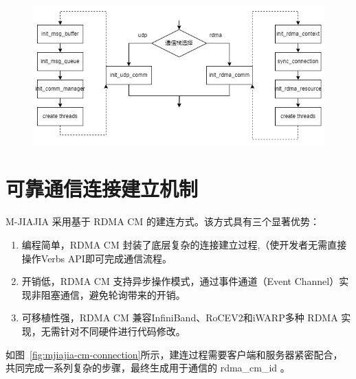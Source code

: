 {    \begin{figure}[!htbp]
        \centering
        \includegraphics[width=\textwidth]{Img/RDMA-comm-modules.png}
        \label{fig:mjiajia-rdma-modules}
    \end{figure}

    \section{可靠通信连接建立机制}
    M-JIAJIA 采用基于 RDMA CM 的建连方式。该方式具有三个显著优势：
    \begin{enumerate}[label=\arabic*.]
        \item 编程简单，RDMA CM 封装了底层复杂的连接建立过程,（使开发者无需直接操作Verbs API即可完成通信流程。
        \item 开销低，RDMA CM 支持异步操作模式，通过事件通道（Event Channel）实现非阻塞通信，避免轮询带来的开销。
        \item 可移植性强，RDMA CM 兼容InfiniBand、RoCEV2和iWARP多种 RDMA 实现，无需针对不同硬件进行代码修改。
    \end{enumerate}

    如图~\ref{fig:mjiajia-cm-connection}所示，建连过程需要客户端和服务器紧密配合，共同完成一系列复杂的步骤，最终生成用于通信的 rdma\_cm\_id 。

}
